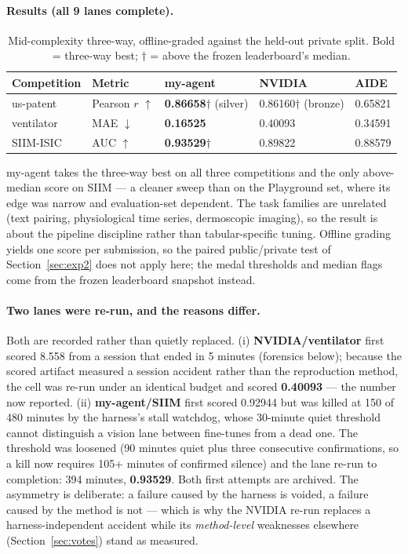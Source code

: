 \documentclass[11pt,a4paper]{article}
\newcommand{\dn}{\ensuremath{\downarrow}}
\newcommand{\up}{\ensuremath{\uparrow}}
\begin{document}
\paragraph{Results (all 9 lanes complete).}
\begin{table}[H]
\centering\small
\caption{Mid-complexity three-way, offline-graded against the held-out private split. Bold = three-way best; $\dagger$ = above the frozen leaderboard's median.}
\begin{tabular}{@{}lllll@{}}
\toprule
\textbf{Competition} & \textbf{Metric} & \textbf{my-agent} & \textbf{NVIDIA} & \textbf{AIDE} \\
\midrule
us-patent & Pearson $r$ \up & \textbf{0.86658}$\dagger$ (silver) & 0.86160$\dagger$ (bronze) & 0.65821 \\
ventilator & MAE \dn & \textbf{0.16525} & 0.40093 & 0.34591 \\
SIIM-ISIC & AUC \up & \textbf{0.93529}$\dagger$ & 0.89822 & 0.88579 \\
\bottomrule
\end{tabular}
\end{table}

my-agent takes the three-way best on all three competitions and the only above-median score on SIIM --- a cleaner sweep than on the Playground set, where its edge was narrow and evaluation-set dependent. The task families are unrelated (text pairing, physiological time series, dermoscopic imaging), so the result is about the pipeline discipline rather than tabular-specific tuning. Offline grading yields one score per submission, so the paired public/private test of Section~\ref{sec:exp2} does not apply here; the medal thresholds and median flags come from the frozen leaderboard snapshot instead.

\paragraph{Two lanes were re-run, and the reasons differ.} Both are recorded rather than quietly replaced. (i) \textbf{NVIDIA/ventilator} first scored 8.558 from a session that ended in 5 minutes (forensics below); because the scored artifact measured a session accident rather than the reproduction method, the cell was re-run under an identical budget and scored \textbf{0.40093} --- the number now reported. (ii) \textbf{my-agent/SIIM} first scored 0.92944 but was killed at 150 of 480 minutes by the harness's stall watchdog, whose 30-minute quiet threshold cannot distinguish a vision lane between fine-tunes from a dead one. The threshold was loosened (90 minutes quiet plus three consecutive confirmations, so a kill now requires 105+ minutes of confirmed silence) and the lane re-run to completion: 394 minutes, \textbf{0.93529}. Both first attempts are archived. The asymmetry is deliberate: a failure caused by the harness is voided, a failure caused by the method is not --- which is why the NVIDIA re-run replaces a harness-independent accident while its \emph{method-level} weaknesses elsewhere (Section~\ref{sec:votes}) stand as measured.
\end{document}
